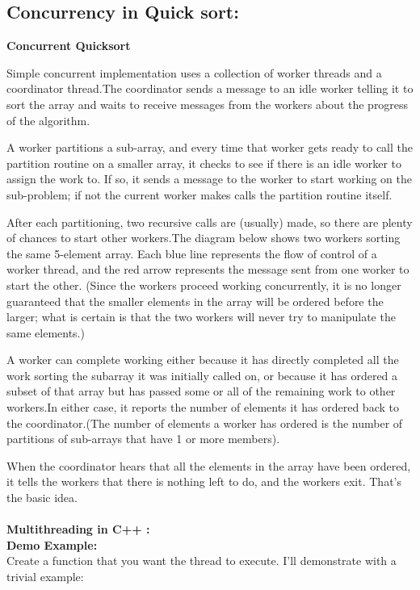 \documentclass[10pt,a4paper]{article}
\begin{document}
	\subsection{Concurrency in Quick sort:}
	\textbf{Concurrent Quicksort} \\
	\par	Simple concurrent implementation uses a collection of worker threads and a coordinator thread.The coordinator sends a message to an idle worker telling it to sort the array and waits to receive messages from the workers about the progress of the algorithm. \par
	A worker partitions a sub-array, and every time that worker gets ready to call the partition routine on a smaller array, it checks to see if there is an idle worker to assign the work to. If so, it sends a message to the worker to start working on the sub-problem; if not the current worker makes calls the partition routine itself.
	\par	After each partitioning, two recursive calls are (usually) made, so there are plenty of chances to start other workers.The diagram below shows two workers sorting the same 5-element array. Each blue line represents the flow of control of a worker thread, and the red arrow represents the message sent from one worker to start the other. (Since the workers proceed working concurrently, it is no longer guaranteed that the smaller elements in the array will be ordered before the larger; what is certain is that the two workers will never try to manipulate the same elements.)
	\par	A worker can complete working either because it has directly completed all the work sorting the subarray it was initially called on, or because it has ordered a subset of that array but has passed some or all of the remaining work to other workers.In either case, it reports the number of elements it has ordered back to the coordinator.(The number of elements a worker has ordered is the number of partitions of sub-arrays that have 1 or more members).
	\par	When the coordinator hears that all the elements in the array have been ordered, it tells the workers that there is nothing left to do, and the workers exit. That's the basic idea.\\\\
	\textbf{Multithreading in C++ :}\\
	\textbf{Demo Example:} \\
	Create a function that you want the thread to execute. I'll demonstrate with a trivial example:\\
\end{document}
